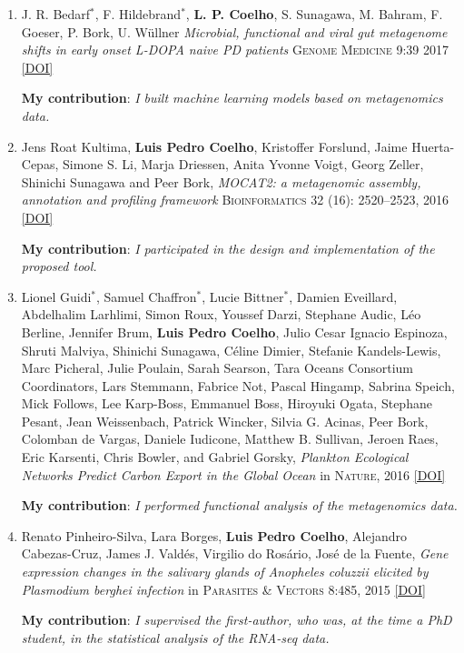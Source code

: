 \documentclass{article}
\newcommand\showdoi[1]{%
    \href{http://dx.doi.org/#1}{[DOI]}%
}
\newcommand\pubname[1]{\textsc{#1}}
\newcommand\contribution[1]{\relax\hfill\break\textbf{My contribution}: \textit{#1}}
\begin{document}
\begin{enumerate}[resume]
\item J. R. Bedarf${}^{*}$, F. Hildebrand${}^{*}$,  \textbf{L. P. Coelho}, S.
Sunagawa, M. Bahram, F. Goeser, P. Bork, U. Wüllner \emph{Microbial, functional
and viral gut metagenome shifts in early onset L-DOPA naive PD patients}
\pubname{Genome Medicine} 9:39 2017 \showdoi{10.1186/s13073-017-0428-y}
\contribution{I built machine learning models based on metagenomics data.}

\item Jens Roat Kultima, \textbf{Luis Pedro Coelho}, Kristoffer Forslund, Jaime
Huerta-Cepas, Simone S. Li, Marja Driessen, Anita Yvonne Voigt, Georg Zeller,
Shinichi Sunagawa and Peer Bork, \emph{MOCAT2: a metagenomic assembly,
annotation and profiling framework} \pubname{Bioinformatics} 32 (16):
2520--2523, 2016 \showdoi{10.1093/bioinformatics/btw183}
\contribution{I participated in the design and implementation of the proposed tool.}

\item Lionel Guidi${}^{*}$, Samuel Chaffron${}^{*}$, Lucie Bittner${}^{*}$,
Damien Eveillard, Abdelhalim Larhlimi, Simon Roux, Youssef Darzi, Stephane
Audic, Léo Berline, Jennifer Brum, \textbf{Luis Pedro Coelho}, Julio Cesar
Ignacio Espinoza, Shruti Malviya, Shinichi Sunagawa, Céline Dimier, Stefanie
Kandels-Lewis, Marc Picheral, Julie Poulain, Sarah Searson, Tara Oceans
Consortium Coordinators, Lars Stemmann, Fabrice Not, Pascal Hingamp, Sabrina
Speich, Mick Follows, Lee Karp-Boss, Emmanuel Boss, Hiroyuki Ogata, Stephane
Pesant, Jean Weissenbach, Patrick Wincker, Silvia G. Acinas, Peer Bork,
Colomban de Vargas, Daniele Iudicone, Matthew B. Sullivan, Jeroen Raes, Eric
Karsenti, Chris Bowler, and Gabriel Gorsky, \emph{Plankton Ecological Networks
Predict Carbon Export in the Global Ocean} in \pubname{Nature}, 2016
\showdoi{10.1038/nature16942}
\contribution{I performed functional analysis of the metagenomics data.}

\item Renato Pinheiro-Silva, Lara Borges, \textbf{Luis Pedro Coelho}, Alejandro
Cabezas-Cruz, James J. Valdés, Virgilio do Rosário, José de la Fuente,
\emph{Gene expression changes in the salivary glands of Anopheles coluzzii
elicited by Plasmodium berghei infection} in \pubname{Parasites \& Vectors}
8:485, 2015 \showdoi{10.1186/s13071-015-1079-8}
\contribution{I supervised the first-author, who was, at the time a PhD
student, in the statistical analysis of the RNA-seq data.}


\end{enumerate}
\end{document}
